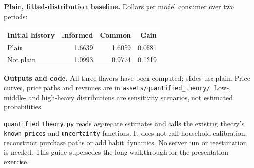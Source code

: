 \documentclass[11pt]{article}
\begin{document}
\textbf{Plain, fitted-distribution baseline.} Dollars per model consumer over two periods:
\begin{center}\begin{tabular}{lrrr}\toprule
Initial history & Informed & Common & Gain\\\midrule
Plain & 1.6639 & 1.6059 & 0.0581\\
Not plain & 1.0993 & 0.9774 & 0.1219\\\bottomrule
\end{tabular}\end{center}

\textbf{Outputs and code.} All three flavors have been computed; slides use plain. Price curves, price paths and revenues are in \texttt{assets/quantified\_theory/}. Low-, middle- and high-heavy distributions are sensitivity scenarios, not estimated probabilities.

\texttt{quantified\_theory.py} reads aggregate estimates and calls the existing theory's \texttt{known\_prices} and \texttt{uncertainty} functions. It does not call household calibration, reconstruct purchase paths or add habit dynamics. No server run or reestimation is needed. This guide supersedes the long walkthrough for the presentation exercise.
\end{document}
